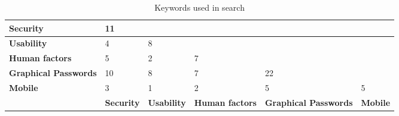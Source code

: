   \begin{table}
      \centering
      \begin{tabular}{| p{1.5cm} | p{1.5cm} | p{1.5cm} | p{1.5cm} | p{1.5 cm} | p{1.5cm} |}
        \hline
        {\bf Security} & 11 & & & & \\ \hline
        {\bf Usability} & 4 & 8 & & & \\ \hline
        {\bf Human factors} & 5 & 2 & 7 & & \\ \hline
        {\bf Graphical Passwords} & 10 & 8 & 7 & 22 & \\ \hline
        {\bf Mobile} & 3 & 1 & 2 & 5 & 5 \\ \hline
         & {\bf Security} & {\bf Usability} & {\bf Human factors} & {\bf Graphical Passwords} & {\bf Mobile} \\ \hline
      \end{tabular}
      \caption{Keywords used in search}
      \label{tab:frequencyKeywords}
    \end{table}
















